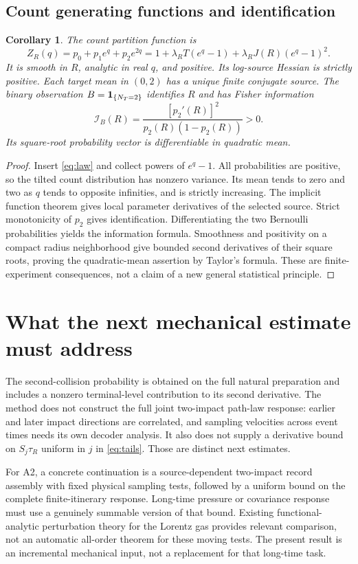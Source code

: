 \documentclass[11pt,reqno]{amsart}
\numberwithin{equation}{section}
\newtheorem{corollary}[theorem]{Corollary}
\theoremstyle{remark}\newtheorem{remark}[theorem]{Remark}
\begin{document}
\subsection{Count generating functions and identification}
\begin{corollary}\label{cor:source}
The count partition function is
\[
 Z_R(q)=p_0+p_1e^q+p_2e^{2q}
 =1+\lambda_RT(e^q-1)+\lambda_RJ(R)(e^q-1)^2.
\]
It is smooth in $R$, analytic in real $q$, and positive. Its log-source Hessian is strictly positive. Each target mean in $(0,2)$ has a unique finite conjugate source. The binary observation $B=\mathbf1_{\{N_T=2\}}$ identifies $R$ and has Fisher information
\[
 \mathcal I_B(R)=\frac{[p_2'(R)]^2}{p_2(R)(1-p_2(R))}>0.
\]
Its square-root probability vector is differentiable in quadratic mean.
\end{corollary}
\begin{proof}
Insert \eqref{eq:law} and collect powers of $e^q-1$. All probabilities are positive, so the tilted count distribution has nonzero variance. Its mean tends to zero and two as $q$ tends to opposite infinities, and is strictly increasing. The implicit function theorem gives local parameter derivatives of the selected source. Strict monotonicity of $p_2$ gives identification. Differentiating the two Bernoulli probabilities yields the information formula. Smoothness and positivity on a compact radius neighborhood give bounded second derivatives of their square roots, proving the quadratic-mean assertion by Taylor's formula. These are finite-experiment consequences, not a claim of a new general statistical principle.
\end{proof}

\section{What the next mechanical estimate must address}
The second-collision probability is obtained on the full natural preparation and includes a nonzero terminal-level contribution to its second derivative. The method does not construct the full joint two-impact path-law response: earlier and later impact directions are correlated, and sampling velocities across event times needs its own decoder analysis. It also does not supply a derivative bound on $S_j\tau_R$ uniform in $j$ in \eqref{eq:tails}. Those are distinct next estimates.

For A2, a concrete continuation is a source-dependent two-impact record assembly with fixed physical sampling tests, followed by a uniform bound on the complete finite-itinerary response. Long-time pressure or covariance response must use a genuinely summable version of that bound. Existing functional-analytic perturbation theory for the Lorentz gas \cite{DemersZhang} provides relevant comparison, not an automatic all-order theorem for these moving tests. The present result is an incremental mechanical input, not a replacement for that long-time task.
\end{document}
